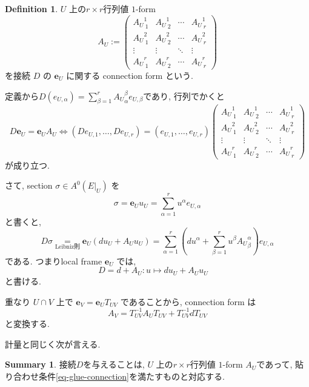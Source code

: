 \documentclass[dvipdfmx,a4paper,11pt]{article} %
\theoremstyle{definition}
\newtheorem{defn}[thm]{Definition}
\newtheorem{suma}[thm]{Summary}
\theoremstyle{remark}
\numberwithin{equation}{section}
\begin{document}
\begin{defn}
\(U\) 上の$r \times r$行列値 \(1\)-form 
\begin{equation}
A_U :=
\begin{pmatrix}
{A_U}^{1}_{\ 1} & {A_U}^{1}_{\ 2} & \cdots & {A_U}^{1}_{\ r} \\
{A_U}^{2}_{\ 1}  & {A_U}^{2}_{\ 2} & \cdots & {A_U}^{2}_{\ r} \\
\vdots & \vdots & \ddots & \vdots\\
{A_U}^{r}_{\ 1}  &{A_U}^{r}_{\ 2}  & \cdots & {A_U}^{r}_{\ r}  
\end{pmatrix}
\end{equation}
を接続 \(D\) の \(\mathbf{e}_U\) に関する connection form という.

定義から$
D(e_{U,\alpha})=\sum_{\beta=1}^{r}{A_{U}}^{\beta}_{\alpha}e_{U,\beta}$であり, 行列でかくと
\begin{equation}
D\mathbf{e}_U=\mathbf{e}_U A_U
\Leftrightarrow 
(De_{U,1},\ldots, De_{U,r})
=
(e_{U,1},\ldots, e_{U,r})
\begin{pmatrix}
{A_U}^{1}_{\ 1} & {A_U}^{1}_{\ 2} & \cdots & {A_U}^{1}_{\ r} \\
{A_U}^{2}_{\ 1}  & {A_U}^{2}_{\ 2} & \cdots & {A_U}^{2}_{\ r} \\
\vdots & \vdots & \ddots & \vdots\\
{A_U}^{r}_{\ 1}  &{A_U}^{r}_{\ 2}  & \cdots & {A_U}^{r}_{\ r}  
\end{pmatrix}
\end{equation}
が成り立つ. 
\end{defn}
さて, section \(\sigma\in A^0(E|_{U})\) を
\[
\sigma=\mathbf{e}_U u_U
=\sum_{\alpha=1}^{r}u^\alpha e_{U,\alpha}
\]
と書くと,
\[
D\sigma
\underset{\text{Leibniz則}}{=}
\mathbf{e}_U(du_U+A_U u_U)
=
\sum_{\alpha=1}^{r}\left(du^\alpha + \sum_{\beta=1}^{r}u^\beta{A_{U}}^{\alpha}_{\beta}\right)e_{U,\alpha}
\]
である. つまりlocal frame \(\mathbf{e}_U\) では,
\[
D=d+A_U
: u \mapsto du_U+A_U u_U
\quad 
\]
と書ける.

重なり \(U\cap V\) 上で \(\mathbf{e}_V=\mathbf{e}_U T_{UV}\) であることから, connection form は
\begin{equation}
\label{eq-glue-connection}
A_V=T_{UV}^{-1}A_U T_{UV}+T_{UV}^{-1}dT_{UV}
\end{equation}
と変換する. 

計量と同じく次が言える. 
\begin{tcolorbox}[mybox]
\begin{suma}
接続$D$を与えることは, \(U\) 上の$r \times r$行列値 \(1\)-form 
$A_U$であって, 貼り合わせ条件\eqref{eq-glue-connection}を満たすものと対応する. 
\end{suma}
\end{tcolorbox}
\end{document}
